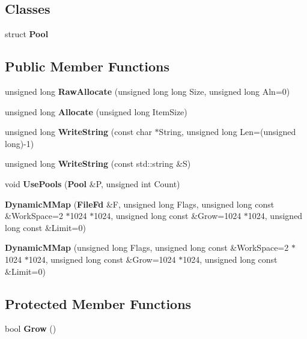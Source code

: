 \subsection*{\-Classes}
\begin{DoxyCompactItemize}
\item 
struct {\bf \-Pool}
\end{DoxyCompactItemize}
\subsection*{\-Public \-Member \-Functions}
\begin{DoxyCompactItemize}
\item 
unsigned long {\bfseries \-Raw\-Allocate} (unsigned long long \-Size, unsigned long \-Aln=0)\label{classDynamicMMap_a46428e7409f37c5f5d3de41a053e7b5b}

\item 
unsigned long {\bfseries \-Allocate} (unsigned long \-Item\-Size)\label{classDynamicMMap_ac874549adae7f0c906ce314aa3023fea}

\item 
unsigned long {\bfseries \-Write\-String} (const char $\ast$\-String, unsigned long \-Len=(unsigned long)-\/1)\label{classDynamicMMap_ac69cc52de18350ae2a70ae8e025af9ba}

\item 
unsigned long {\bfseries \-Write\-String} (const std\-::string \&\-S)\label{classDynamicMMap_a0329447b4c2764617ff943a89213b0c6}

\item 
void {\bfseries \-Use\-Pools} ({\bf \-Pool} \&\-P, unsigned int \-Count)\label{classDynamicMMap_aff9c5ca4c159317274d3ce35f80b70da}

\item 
{\bfseries \-Dynamic\-M\-Map} ({\bf \-File\-Fd} \&\-F, unsigned long \-Flags, unsigned long const \&\-Work\-Space=2 $\ast$1024 $\ast$1024, unsigned long const \&\-Grow=1024 $\ast$1024, unsigned long const \&\-Limit=0)\label{classDynamicMMap_ad6274529ac74859c33352bec4999489d}

\item 
{\bfseries \-Dynamic\-M\-Map} (unsigned long \-Flags, unsigned long const \&\-Work\-Space=2 $\ast$1024 $\ast$1024, unsigned long const \&\-Grow=1024 $\ast$1024, unsigned long const \&\-Limit=0)\label{classDynamicMMap_acf6630bc42757dc601a6575acb6a00c2}

\end{DoxyCompactItemize}
\subsection*{\-Protected \-Member \-Functions}
\begin{DoxyCompactItemize}
\item 
bool {\bfseries \-Grow} ()\label{classDynamicMMap_a12b70db47502e5451fbe67df100c49ba}

\end{DoxyCompactItemize}
